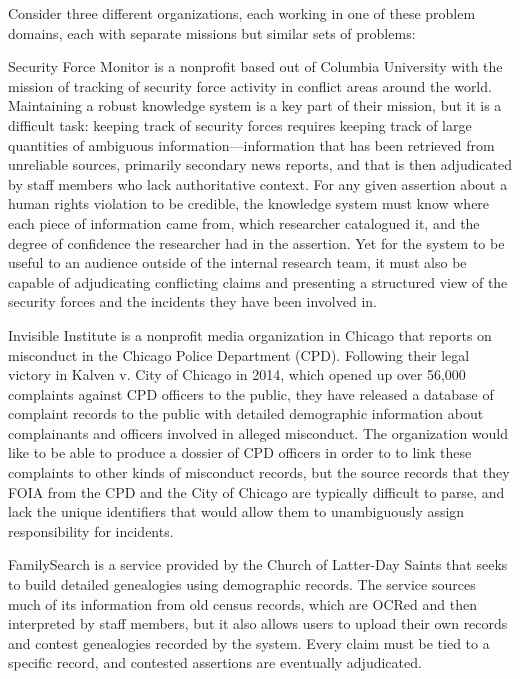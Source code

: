 \documentclass[format=siggraph, review=true]{acmart}
\begin{document}
Consider three different organizations, each working in one of these problem
domains, each with separate missions but similar sets of problems:

Security Force Monitor is a nonprofit based out of Columbia University
with the mission of tracking of security force activity in conflict areas
around the world. Maintaining a robust knowledge system is a key part of
their mission, but it is a difficult task: keeping track of security forces
requires keeping track of large quantities of ambiguous
information—information that has been retrieved from unreliable sources,
primarily secondary news reports, and that is then adjudicated by staff
members who lack authoritative context. For any given assertion about a
human rights violation to be credible, the knowledge system must know
where each piece of information came from, which researcher catalogued it,
and the degree of confidence the researcher had in the assertion. Yet for
the system to be useful to an audience outside of the internal research
team, it must also be capable of adjudicating conflicting claims and
presenting a structured view of the security forces and the incidents
they have been involved in.

Invisible Institute is a nonprofit media organization in Chicago that
reports on misconduct in the Chicago Police Department (CPD). Following
their legal victory in Kalven v. City of Chicago in 2014, which opened
up over 56,000 complaints against CPD officers to the public, they have
released a database of complaint records to the public with detailed
demographic information about complainants and officers involved in
alleged misconduct. The organization would like to be able to produce
a dossier of CPD officers in order to to link these complaints to other
kinds of misconduct records, but the source records that they FOIA from
the CPD and the City of Chicago are typically difficult to parse, and
lack the unique identifiers that would allow them to unambiguously
assign responsibility for incidents.

FamilySearch is a service provided by the Church of Latter-Day Saints
that seeks to build detailed genealogies using demographic records.
The service sources much of its information from old census records,
which are OCRed and then interpreted by staff members, but it also allows
users to upload their own records and contest genealogies recorded by the
system. Every claim must be tied to a specific record, and contested
assertions are eventually adjudicated.
\end{document}
